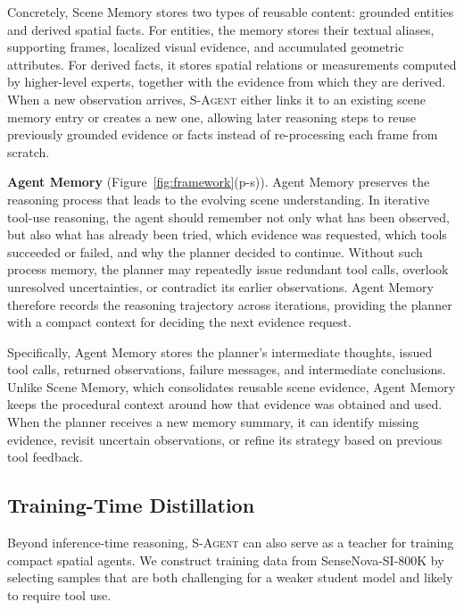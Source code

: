 \documentclass{llmxive}
\begin{document}
Concretely, Scene Memory stores two types of reusable content: grounded entities and derived spatial facts.
For entities, the memory stores their textual aliases, supporting frames, localized visual evidence, and accumulated geometric attributes. 
For derived facts, it stores spatial relations or measurements computed by higher-level experts, together with the evidence from which they are derived.
% 
When a new observation arrives, \textsc{S-Agent} either links it to an existing scene memory entry or creates a new one, allowing later reasoning steps to reuse previously grounded evidence or facts instead of re-processing each frame from scratch.


\textbf{Agent Memory} (Figure~\ref{fig:framework}(p-s)).
Agent Memory preserves the reasoning process that leads to the evolving scene understanding. 
In iterative tool-use reasoning, the agent should remember not only what has been observed, but also what has already been tried, which evidence was requested, which tools succeeded or failed, and why the planner decided to continue.
% 
Without such process memory, the planner may repeatedly issue redundant tool calls, overlook unresolved uncertainties, or contradict its earlier observations.
% 
Agent Memory therefore records the reasoning trajectory across iterations, providing the planner with a compact context for deciding the next evidence request.

Specifically, Agent Memory stores the planner's intermediate thoughts, issued tool calls, returned observations, failure messages, and intermediate conclusions.
% 
Unlike Scene Memory, which consolidates reusable scene evidence, Agent Memory keeps the procedural context around how that evidence was obtained and used. 
% 
When the planner receives a new memory summary, it can identify missing evidence, revisit uncertain observations, or refine its strategy based on previous tool feedback.


\subsection{Training-Time Distillation}
\label{sec:method:training}
Beyond inference-time reasoning, \textsc{S-Agent} can also serve as a teacher for training compact spatial agents. 
We construct training data from SenseNova-SI-800K \citep{sensenova_si} by selecting samples that are both challenging for a weaker student model and likely to require tool use. 
\end{document}
